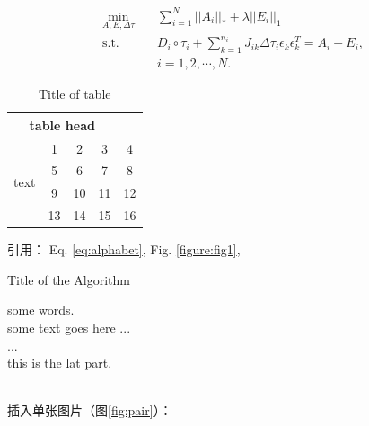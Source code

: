 \documentclass[UTF8,a4paper,12pt]{ctexart}
\newcommand{\reffig}[1]{（图\ref{#1}）}
\begin{document}
 \begin{equation}
 \begin{aligned} \label{eq:rasl}
 \min_{A,E,\Delta \tau} \quad & \sum_{i=1}^{N}||A_i||_* + \lambda ||E_i||_1  \\
 \mathrm{s.t.} \quad & D_i \circ \tau_i + \sum_{k=1}^{n_i} J_{ik} \Delta \tau_i \epsilon_k \epsilon_k^T = A_i + E_i, \\
 & i = 1,2,\cdots,N. 
 \end{aligned}
 \end{equation}
 
 \begin{table}[htbp]
 	\caption{Title of table} \label{tab:table}
 	\centering
 	\addtolength{\tabcolsep}{-0mm} %
 	\begin{tabular}{ccccc}
 		\toprule[0.75pt]	%
 		\multicolumn{4}{c}{table head} \\
 		\midrule[0.5pt]	%
 		\multirow{4}{*}{text} & 1 & 2 & 3 & 4 \\  %
 		& 5 & 6 & 7 & 8 \\
 		\cmidrule[0.5pt]{2-4}	%
 		& 9 & 10 & 11 & 12 \\
 		& 13 & 14 & 15 & 16 \\
 		\bottomrule[0.75pt]	%
 	\end{tabular}
 \end{table}
 引用： Eq. \eqref{eq:alphabet}, Fig. \ref{figure:fig1},  \\
 
 
 \begin{algorithm}
 	\caption{Title of the Algorithm}
 	\label{algo:ref}
 	\begin{algorithmic}[1]
 		\REQUIRE some words.  %
 		\ENSURE ~\\           %
 		some text goes here ... \\
 		\STATE ... \\  %
 		\ENDWHILE
 		\RETURN this is the lat part.  %
 	\end{algorithmic}
 \end{algorithm}
 
 ~\\ %
 
 插入单张图片\reffig{fig:pair}：
 
\end{document}
